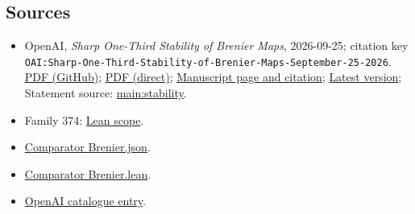 \documentclass[11pt]{article}
\begin{document}
\subsection{Sources}
\begin{itemize}
\item OpenAI, \emph{Sharp One-Third Stability of Brenier Maps}, 2026-09-25; citation key \texttt{OAI:Sharp-One-Third-Stability-of-Brenier-Maps-September-25-2026}. \href{https://github.com/openai/math/blob/adc7f1241b42e322a6451854ab7e4b4c146bf78a/preprints/Sharp-One-Third-Stability-of-Brenier-Maps-September-25-2026/article.pdf}{PDF (GitHub)}; \href{https://github.com/openai/math/raw/adc7f1241b42e322a6451854ab7e4b4c146bf78a/preprints/Sharp-One-Third-Stability-of-Brenier-Maps-September-25-2026/article.pdf}{PDF (direct)}; \href{https://github.com/openai/math/blob/adc7f1241b42e322a6451854ab7e4b4c146bf78a/preprints/Sharp-One-Third-Stability-of-Brenier-Maps-September-25-2026/README.md}{Manuscript page and citation}; \href{https://github.com/openai/math/blob/main/preprints/Sharp-One-Third-Stability-of-Brenier-Maps-September-25-2026/article.pdf}{Latest version}; Statement source: \href{https://github.com/openai/math/blob/adc7f1241b42e322a6451854ab7e4b4c146bf78a/preprints/Sharp-One-Third-Stability-of-Brenier-Maps-September-25-2026/build/source/sections/introduction.tex\#L31}{main:stability}.
\item Family 374: \href{https://github.com/openai/math/blob/adc7f1241b42e322a6451854ab7e4b4c146bf78a/lean/docs/374.md}{Lean scope}.
\item \href{https://github.com/openai/math/blob/adc7f1241b42e322a6451854ab7e4b4c146bf78a/lean/ComparatorChallenges/Brenier.json}{Comparator Brenier.json}.
\item \href{https://github.com/openai/math/blob/adc7f1241b42e322a6451854ab7e4b4c146bf78a/lean/ComparatorChallenges/Brenier.lean}{Comparator Brenier.lean}.
\item \href{https://github.com/openai/math/blob/adc7f1241b42e322a6451854ab7e4b4c146bf78a/CONTENTS.md}{OpenAI catalogue entry}.
\end{itemize}
\end{document}
